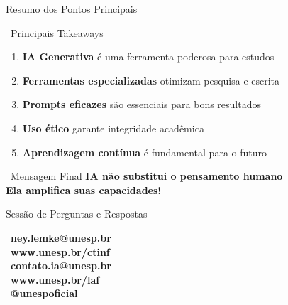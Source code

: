 \documentclass[aspectratio=169,12pt]{beamer}
\begin{document}
\begin{frame}{Resumo dos Pontos Principais}
    \begin{block}{\faList\, Principais Takeaways}
        \begin{enumerate}
            \item \textbf{IA Generativa} é uma ferramenta poderosa para estudos
            \item \textbf{Ferramentas especializadas} otimizam pesquisa e escrita
            \item \textbf{Prompts eficazes} são essenciais para bons resultados
            \item \textbf{Uso ético} garante integridade acadêmica
            \item \textbf{Aprendizagem contínua} é fundamental para o futuro
        \end{enumerate}
    \end{block}
    
    \begin{alertblock}{\faBullhorn\, Mensagem Final}
        \centering
        \textbf{IA não substitui o pensamento humano} \\
        \textbf{Ela amplifica suas capacidades!}
    \end{alertblock}
\end{frame}
\begin{frame}{Sessão de Perguntas e Respostas}
    \begin{center}
        
        \vspace{1cm}
        
        \textcolor{accent}{\faEnvelope}\, \textbf{ney.lemke@unesp.br} \\
        \textcolor{secondary}{\faGlobe}\, \textbf{www.unesp.br/ctinf} \\
        \textcolor{accent}{\faEnvelope}\, \textbf{contato.ia@unesp.br} \\
        \textcolor{secondary}{\faGlobe}\, \textbf{www.unesp.br/laf} \\
        \textcolor{success}{\faInstagram}\, \textbf{@unespoficial} \\
    \end{center}
\end{frame}
\end{document}
